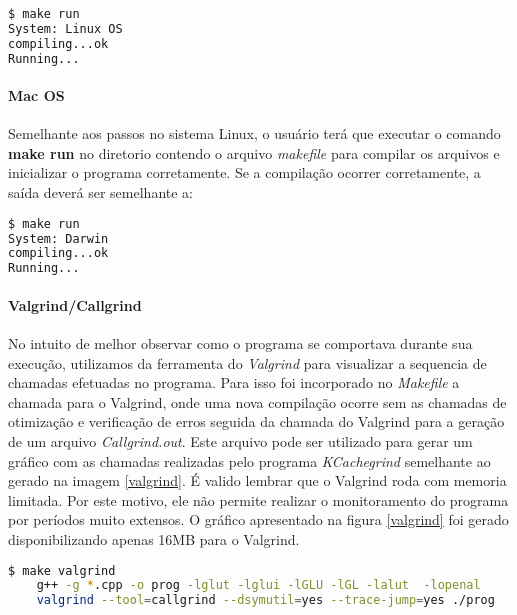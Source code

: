 \begin{lstlisting}[language=bash,title=\textit{Saída do terminal - Linux},numbers=none]
$ make run
System: Linux OS
compiling...ok
Running...
\end{lstlisting}

\paragraph{\textbf{Mac OS}}

Semelhante aos passos no sistema Linux, o usuário terá que executar o comando \textbf{make run} no diretorio contendo o arquivo \textit{makefile} para compilar os arquivos e inicializar o programa corretamente. Se a compilação ocorrer corretamente, a saída deverá ser semelhante a:

\begin{lstlisting}[language=bash,title=\textit{Saída do terminal - Mac OS},numbers=none]
$ make run
System: Darwin
compiling...ok
Running...
\end{lstlisting}


\paragraph{\textbf{Valgrind/Callgrind}}

No intuito de melhor observar como o programa se comportava durante sua execução, utilizamos da ferramenta do \textit{Valgrind} para visualizar a sequencia de chamadas efetuadas no programa.
Para isso foi incorporado no \textit{Makefile} a chamada para o Valgrind, onde uma nova compilação ocorre sem as chamadas de otimização e verificação de erros seguida da chamada do Valgrind para a geração de um arquivo \textit{Callgrind.out}. Este arquivo pode ser utilizado para gerar um gráfico com as chamadas realizadas pelo programa \textit{KCachegrind} semelhante ao gerado na imagem \ref{valgrind}. É valido lembrar que o Valgrind roda com memoria limitada. Por este motivo, ele não permite realizar o monitoramento do programa por períodos muito extensos. O gráfico apresentado na figura \ref{valgrind} foi gerado disponibilizando apenas 16MB para o Valgrind.

\begin{lstlisting}[language=bash,title=\textit{Gerando arquivo callgrind.out},numbers=none]
$ make valgrind
	g++ -g *.cpp -o prog -lglut -lglui -lGLU -lGL -lalut  -lopenal
	valgrind --tool=callgrind --dsymutil=yes --trace-jump=yes ./prog
\end{lstlisting}

